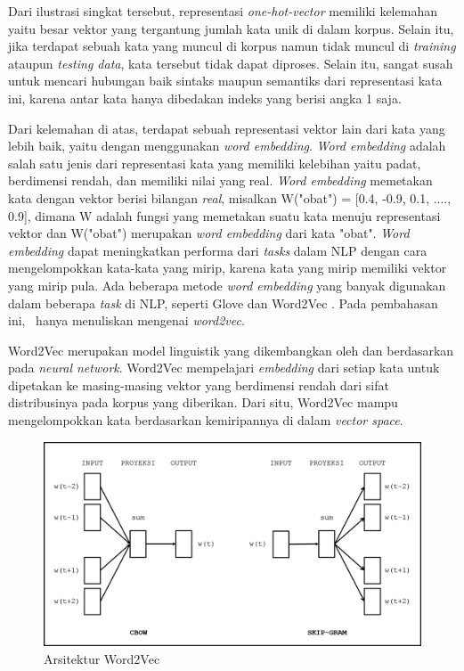 Dari ilustrasi singkat tersebut, representasi \textit{one-hot-vector} memiliki kelemahan yaitu besar vektor yang tergantung jumlah kata unik di dalam korpus. Selain itu, jika terdapat sebuah kata yang muncul di korpus namun tidak muncul di \textit{training} ataupun \textit{testing data}, kata tersebut tidak dapat diproses. Selain itu, sangat susah untuk mencari hubungan baik sintaks maupun semantiks dari representasi kata ini, karena antar kata hanya dibedakan indeks yang berisi angka 1 saja.

Dari kelemahan di atas, terdapat sebuah representasi vektor lain dari kata yang lebih baik, yaitu dengan menggunakan \textit{word embedding}. \textit{Word embedding} adalah salah satu jenis dari representasi kata yang memiliki kelebihan yaitu padat, berdimensi rendah, dan memiliki nilai yang real. \textit{Word embedding} memetakan kata dengan vektor berisi bilangan \textit{real}, misalkan W("obat") = [0.4, -0.9, 0.1, ...., 0.9], dimana W adalah fungsi yang memetakan suatu kata menuju representasi vektor dan W("obat") merupakan \textit{word embedding} dari kata "obat". \textit{Word embedding} dapat meningkatkan performa dari \textit{tasks} dalam NLP dengan cara mengelompokkan kata-kata yang mirip, karena kata yang mirip memiliki vektor yang mirip pula. Ada beberapa metode \textit{word embedding} yang banyak digunakan dalam beberapa \textit{task} di NLP, seperti Glove \citep{pennington2014glove} dan Word2Vec \citep{mikolov2014word2vec}. Pada pembahasan ini, \saya~hanya menuliskan mengenai \textit{word2vec}.

Word2Vec merupakan model linguistik yang dikembangkan oleh \cite{mikolov} dan berdasarkan pada \textit{neural network}. Word2Vec mempelajari \textit{embedding} dari setiap kata untuk dipetakan ke masing-masing vektor yang berdimensi rendah dari sifat distribusinya pada korpus yang diberikan. Dari situ, Word2Vec mampu mengelompokkan kata berdasarkan kemiripannya di dalam \textit{vector space}.

\begin{figure}
	\centering
	\includegraphics[width=0.85\linewidth]{images/word2vec}
	\caption{Arsitektur Word2Vec}
	\label{fig:word2vec}
\end{figure}

